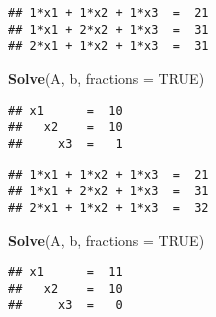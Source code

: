\documentclass[]{article}
\newenvironment{Shaded}{\begin{snugshade}}{\end{snugshade}}
\newcommand{\CommentTok}[1]{\textcolor[rgb]{0.56,0.35,0.01}{\textit{#1}}}
\newcommand{\DataTypeTok}[1]{\textcolor[rgb]{0.13,0.29,0.53}{#1}}
\newcommand{\DecValTok}[1]{\textcolor[rgb]{0.00,0.00,0.81}{#1}}
\newcommand{\KeywordTok}[1]{\textcolor[rgb]{0.13,0.29,0.53}{\textbf{#1}}}
\newcommand{\NormalTok}[1]{#1}
\newcommand{\OtherTok}[1]{\textcolor[rgb]{0.56,0.35,0.01}{#1}}
\newcommand{\StringTok}[1]{\textcolor[rgb]{0.31,0.60,0.02}{#1}}
\begin{document}
\begin{Shaded}
\end{Shaded}

\begin{verbatim}
## 1*x1 + 1*x2 + 1*x3  =  21 
## 1*x1 + 2*x2 + 1*x3  =  31 
## 2*x1 + 1*x2 + 1*x3  =  31
\end{verbatim}

\begin{Shaded}
\begin{Highlighting}[]
\KeywordTok{Solve}\NormalTok{(A, b, }\DataTypeTok{fractions =} \OtherTok{TRUE}\NormalTok{)}
\end{Highlighting}
\end{Shaded}

\begin{verbatim}
## x1      =  10 
##   x2    =  10 
##     x3  =   1
\end{verbatim}

\begin{Shaded}
\end{Shaded}

\begin{verbatim}
## 1*x1 + 1*x2 + 1*x3  =  21 
## 1*x1 + 2*x2 + 1*x3  =  31 
## 2*x1 + 1*x2 + 1*x3  =  32
\end{verbatim}

\begin{Shaded}
\begin{Highlighting}[]
\KeywordTok{Solve}\NormalTok{(A, b, }\DataTypeTok{fractions =} \OtherTok{TRUE}\NormalTok{)}
\end{Highlighting}
\end{Shaded}

\begin{verbatim}
## x1      =  11 
##   x2    =  10 
##     x3  =   0
\end{verbatim}

\begin{Shaded}
\end{Shaded}
\end{document}

